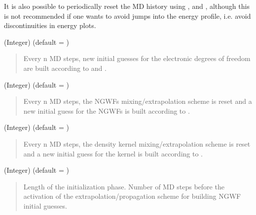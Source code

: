 \documentclass[letterpaper,10pt,english]{sphinxmanual}
\begin{document}
It is also possible to periodically reset the MD history using
,  and ,
although this is not recommended if one wants to avoid jumps into the
energy profile, i.e. avoid discontinuities in energy plots.

 (Integer) (default = )
\begin{quote}

\begin{DUlineblock}{0em}
\item[] Every n MD steps, new initial guesses for the electronic degrees of freedom are built according to  and .
\end{DUlineblock}
\end{quote}

 (Integer) (default = )
\begin{quote}

\begin{DUlineblock}{0em}
\item[] Every n MD steps, the NGWFs mixing/extrapolation scheme is reset and a new initial guess for the NGWFs is built according to .
\end{DUlineblock}
\end{quote}

 (Integer) (default = )
\begin{quote}

\begin{DUlineblock}{0em}
\item[] Every n MD steps, the density kernel mixing/extrapolation scheme is reset and a new initial guess for the kernel is built according to .
\end{DUlineblock}
\end{quote}

 (Integer) (default = )
\begin{quote}

\begin{DUlineblock}{0em}
\item[] Length of the initialization phase. Number of MD steps before the activation of the extrapolation/propagation scheme for building NGWF initial guesses.
\end{DUlineblock}
\end{quote}
\end{document}
